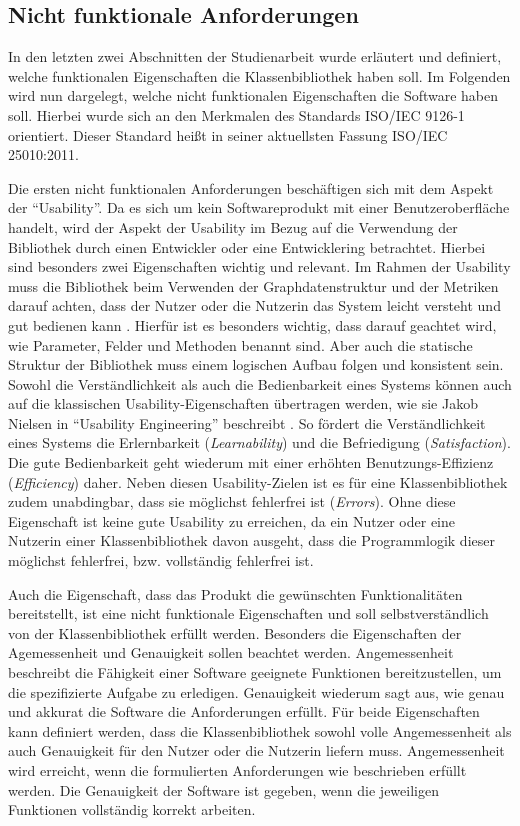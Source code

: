 \documentclass[a4paper,12pt,ngerman,chapterprefix=false,listof=totoc,bibliography=totoc]{scrreprt}
\begin{document}
{{\subsection{Nicht funktionale Anforderungen}
{
In den letzten zwei Abschnitten der Studienarbeit wurde erläutert und definiert, welche funktionalen Eigenschaften die Klassenbibliothek haben soll. Im Folgenden wird nun dargelegt, welche nicht funktionalen Eigenschaften die Software haben soll. Hierbei wurde sich an den Merkmalen des Standards ISO/IEC 9126-1 orientiert. \cite{balzert_lehrbuch_2009} Dieser Standard heißt in seiner aktuellsten Fassung ISO/IEC 25010:2011.

Die ersten nicht funktionalen Anforderungen beschäftigen sich mit dem Aspekt der "`Usability"'. Da es sich um kein Softwareprodukt mit einer Benutzeroberfläche handelt, wird der Aspekt der Usability im Bezug auf die Verwendung der Bibliothek durch einen Entwickler oder eine Entwicklering betrachtet. Hierbei sind besonders zwei Eigenschaften wichtig und relevant. Im Rahmen der Usability muss die Bibliothek beim Verwenden der Graphdatenstruktur und der Metriken darauf achten, dass der Nutzer oder die Nutzerin das System leicht versteht und gut bedienen kann \cite{balzert_lehrbuch_2009}. Hierfür ist es besonders wichtig, dass darauf geachtet wird, wie Parameter, Felder und Methoden benannt sind. Aber auch die statische Struktur der Bibliothek muss einem logischen Aufbau folgen und konsistent sein. Sowohl die Verständlichkeit als auch die Bedienbarkeit eines Systems können auch auf die klassischen Usability-Eigenschaften übertragen werden, wie sie Jakob Nielsen in "`Usability Engineering"' beschreibt \cite{nielsen_usability_2010}. So fördert die Verständlichkeit eines Systems die Erlernbarkeit (\textit{Learnability}) und die Befriedigung (\textit{Satisfaction}). Die gute Bedienbarkeit geht wiederum mit einer erhöhten Benutzungs-Effizienz (\textit{Efficiency}) daher. Neben diesen Usability-Zielen ist es für eine Klassenbibliothek zudem unabdingbar, dass sie möglichst fehlerfrei ist (\textit{Errors}). Ohne diese Eigenschaft ist keine gute Usability zu erreichen, da ein Nutzer oder eine Nutzerin einer Klassenbibliothek davon ausgeht, dass die Programmlogik dieser möglichst fehlerfrei, bzw. vollständig fehlerfrei ist.

Auch die Eigenschaft, dass das Produkt die gewünschten Funktionalitäten bereitstellt, ist eine nicht funktionale Eigenschaften und soll selbstverständlich von der Klassenbibliothek erfüllt werden. Besonders die Eigenschaften der Agemessenheit und Genauigkeit sollen beachtet werden. Angemessenheit beschreibt die Fähigkeit einer Software geeignete Funktionen bereitzustellen, um die spezifizierte Aufgabe zu erledigen. Genauigkeit wiederum sagt aus, wie genau und akkurat die Software die Anforderungen erfüllt. Für beide Eigenschaften kann definiert werden, dass die Klassenbibliothek sowohl volle Angemessenheit als auch Genauigkeit für den Nutzer oder die Nutzerin liefern muss. Angemessenheit wird erreicht, wenn die formulierten Anforderungen wie beschrieben erfüllt werden. Die Genauigkeit der Software ist gegeben, wenn die jeweiligen Funktionen vollständig korrekt arbeiten.

}}}
\end{document}
